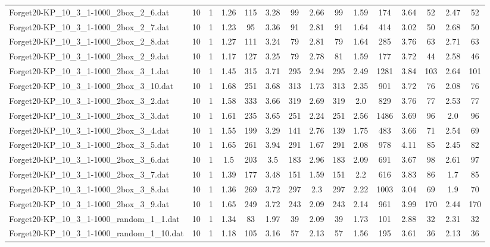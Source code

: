 \begin{table}[!ht]
{\begin{tabular}{lcccccccccccccc}
Forget20-KP\_10\_3\_1-1000\_2box\_2\_6.dat & 10 & 1 & 1.26 & 115 & 3.28 & 99 & 2.66 & 99 & 1.59 & 174 & 3.64 & 52 & 2.47 & 52 \\
Forget20-KP\_10\_3\_1-1000\_2box\_2\_7.dat & 10 & 1 & 1.23 & 95 & 3.36 & 91 & 2.81 & 91 & 1.64 & 414 & 3.02 & 50 & 2.68 & 50 \\
Forget20-KP\_10\_3\_1-1000\_2box\_2\_8.dat & 10 & 1 & 1.27 & 111 & 3.24 & 79 & 2.81 & 79 & 1.64 & 285 & 3.76 & 63 & 2.71 & 63 \\
Forget20-KP\_10\_3\_1-1000\_2box\_2\_9.dat & 10 & 1 & 1.17 & 127 & 3.25 & 79 & 2.78 & 81 & 1.59 & 177 & 3.72 & 44 & 2.58 & 46 \\
Forget20-KP\_10\_3\_1-1000\_2box\_3\_1.dat & 10 & 1 & 1.45 & 315 & 3.71 & 295 & 2.94 & 295 & 2.49 & 1281 & 3.84 & 103 & 2.64 & 101 \\
Forget20-KP\_10\_3\_1-1000\_2box\_3\_10.dat & 10 & 1 & 1.68 & 251 & 3.68 & 313 & 1.73 & 313 & 2.35 & 901 & 3.72 & 76 & 2.08 & 76 \\
Forget20-KP\_10\_3\_1-1000\_2box\_3\_2.dat & 10 & 1 & 1.58 & 333 & 3.66 & 319 & 2.69 & 319 & 2.0 & 829 & 3.76 & 77 & 2.53 & 77 \\
Forget20-KP\_10\_3\_1-1000\_2box\_3\_3.dat & 10 & 1 & 1.61 & 235 & 3.65 & 251 & 2.24 & 251 & 2.56 & 1486 & 3.69 & 96 & 2.0 & 96 \\
Forget20-KP\_10\_3\_1-1000\_2box\_3\_4.dat & 10 & 1 & 1.55 & 199 & 3.29 & 141 & 2.76 & 139 & 1.75 & 483 & 3.66 & 71 & 2.54 & 69 \\
Forget20-KP\_10\_3\_1-1000\_2box\_3\_5.dat & 10 & 1 & 1.65 & 261 & 3.94 & 291 & 1.67 & 291 & 2.08 & 978 & 4.11 & 85 & 2.45 & 82 \\
Forget20-KP\_10\_3\_1-1000\_2box\_3\_6.dat & 10 & 1 & 1.5 & 203 & 3.5 & 183 & 2.96 & 183 & 2.09 & 691 & 3.67 & 98 & 2.61 & 97 \\
Forget20-KP\_10\_3\_1-1000\_2box\_3\_7.dat & 10 & 1 & 1.39 & 177 & 3.48 & 151 & 1.59 & 151 & 2.2 & 616 & 3.83 & 86 & 1.7 & 85 \\
Forget20-KP\_10\_3\_1-1000\_2box\_3\_8.dat & 10 & 1 & 1.36 & 269 & 3.72 & 297 & 2.3 & 297 & 2.22 & 1003 & 3.04 & 69 & 1.9 & 70 \\
Forget20-KP\_10\_3\_1-1000\_2box\_3\_9.dat & 10 & 1 & 1.65 & 249 & 3.72 & 243 & 2.09 & 243 & 2.14 & 961 & 3.99 & 170 & 2.44 & 170 \\
Forget20-KP\_10\_3\_1-1000\_random\_1\_1.dat & 10 & 1 & 1.34 & 83 & 1.97 & 39 & 2.09 & 39 & 1.73 & 101 & 2.88 & 32 & 2.31 & 32 \\
Forget20-KP\_10\_3\_1-1000\_random\_1\_10.dat & 10 & 1 & 1.18 & 105 & 3.16 & 57 & 2.13 & 57 & 1.56 & 195 & 3.61 & 36 & 2.13 & 36 \\

\end{tabular}}
\end{table}
